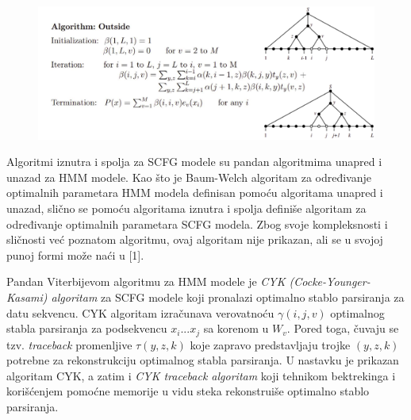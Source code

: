 \documentclass[a4paper, 12pt]{article}
\begin{document}
\begin{figure}[h!]
  \centering
  \vspace{-0.2cm}
  \includegraphics[width=\textwidth]{outside}
\end{figure}


Algoritmi iznutra i spolja za SCFG modele su pandan algoritmima unapred i unazad za HMM modele. Kao što je Baum-Welch algoritam za određivanje optimalnih parametara HMM modela definisan pomoću algoritama unapred i unazad, slično se pomoću algoritama iznutra i spolja definiše algoritam za određivanje optimalnih parametara SCFG modela. Zbog svoje kompleksnosti i sličnosti već poznatom algoritmu, ovaj algoritam nije prikazan, ali se u svojoj punoj formi može naći u [1].

\newpage

Pandan Viterbijevom algoritmu za HMM modele je \textit{CYK (Cocke-Younger-Kasami) algoritam} za SCFG modele koji pronalazi optimalno stablo parsiranja za datu sekvencu. CYK algoritam izračunava verovatnoću $\gamma(i, j, v)$ optimalnog stabla parsiranja za podsekvencu $x_i...x_j$ sa korenom u $W_v$. Pored toga, čuvaju se tzv. \textit{traceback} promenljive $\tau(y, z, k)$ koje zapravo predstavljaju trojke $(y, z, k)$ potrebne za rekonstrukciju optimalnog stabla parsiranja. U nastavku je prikazan algoritam CYK, a zatim i \textit{CYK traceback algoritam} koji tehnikom bektrekinga i korišćenjem pomoćne memorije u vidu steka rekonstruiše optimalno stablo parsiranja.
\end{document}
